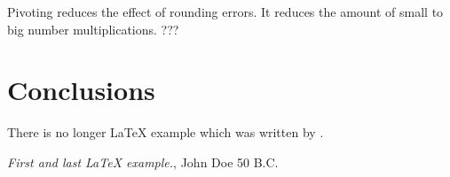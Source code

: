 \documentclass{scrartcl}
\begin{document}
Pivoting reduces the effect of rounding errors. It reduces the amount of small to big number multiplications. ???

\section{Conclusions}\label{conclusions}
There is no longer \LaTeX{} example which was written by \cite{doe}.


\begin{thebibliography}{9}
 \emph{First and last \LaTeX{} example.},
John Doe 50 B.C. 
\end{thebibliography}
\end{document}
